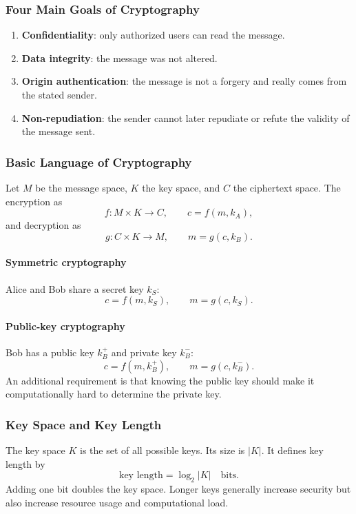 \documentclass[12pt]{article}
\begin{document}
\subsubsection{Four Main Goals of Cryptography}
\begin{enumerate}
    \item \textbf{Confidentiality}: only authorized users can read the message.
    \item \textbf{Data integrity}: the message was not altered.
    \item \textbf{Origin authentication}: the message is not a forgery and really comes from the stated sender.
    \item \textbf{Non-repudiation}: the sender cannot later repudiate or refute the validity of the message sent.
\end{enumerate}

\subsubsection{Basic Language of Cryptography}
Let $M$ be the message space, $K$ the key space, and $C$ the ciphertext space. The encryption as
\[
f:M\times K\rightarrow C,
\qquad c=f(m,k_A),
\]
and decryption as
\[
g:C\times K\rightarrow M,
\qquad m=g(c,k_B).
\]

\paragraph{Symmetric cryptography}
Alice and Bob share a secret key $k_S$:
\[
c=f(m,k_S),\qquad m=g(c,k_S).
\]

\paragraph{Public-key cryptography}
Bob has a public key $k_B^+$ and private key $k_B^-$:
\[
c=f(m,k_B^+),\qquad m=g(c,k_B^-).
\]
An additional requirement is that knowing the public key should make it computationally hard to determine the private key.

\subsubsection{Key Space and Key Length}
The key space $K$ is the set of all possible keys. Its size is $|K|$. It defines key length by
\[
\text{key length}=\log_2|K|\quad\text{bits}.
\]
Adding one bit doubles the key space. Longer keys generally increase security but also increase resource usage and computational load.
\end{document}
